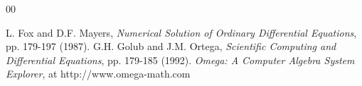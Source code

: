\documentclass[11pt]{article}
\begin{document}





\begin{thebibliography}{00}
\setlength{\itemsep}{-1mm}
\footnotesize
{} L. Fox and D.F. Mayers, \textit{Numerical Solution of Ordinary Differential 
Equations}, pp. 179-197 (1987).
 G.H. Golub and J.M. Ortega, \textit{Scientific Computing and Differential Equations}, 
pp. 179-185 (1992).
\textit{Omega: A Computer Algebra System Explorer}, at http://www.omega-math.com
\end{thebibliography}
\normalsize
\end{document}

